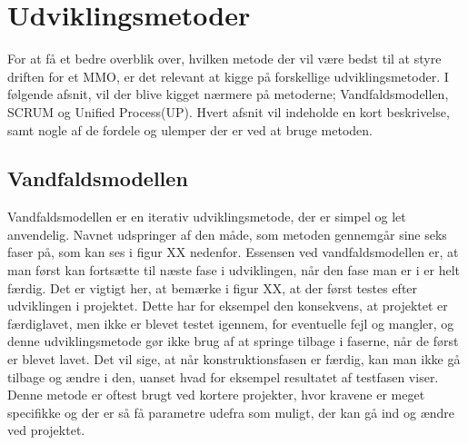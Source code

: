 \cfoot{\page\textbackslash \totalp} %
\chapter{Udviklingsmetoder}
For at få et bedre overblik over, hvilken metode der vil være bedst til at styre driften for et MMO, er det relevant at kigge på forskellige udviklingsmetoder. I følgende afsnit, vil der blive kigget nærmere på metoderne; Vandfaldsmodellen, SCRUM og Unified Process(UP). Hvert afsnit vil indeholde en kort beskrivelse, samt nogle af de fordele og ulemper der er ved at bruge metoden.

\section{Vandfaldsmodellen}\cite{HTL}
Vandfaldsmodellen er en iterativ udviklingsmetode, der er simpel og let anvendelig. Navnet udspringer af den måde, som metoden gennemgår sine seks faser på, som kan ses i figur XX nedenfor. Essensen ved vandfaldsmodellen er, at man først kan fortsætte til næste fase i udviklingen, når den fase man er i er helt færdig. Det er vigtigt her, at bemærke i figur XX, at der først testes efter udviklingen i projektet. Dette har for eksempel den konsekvens, at projektet er færdiglavet, men ikke er blevet testet igennem, for eventuelle fejl og mangler, og denne udviklingsmetode gør ikke brug af at springe tilbage i faserne, når de først er blevet lavet. Det vil sige, at når konstruktionsfasen er færdig, kan man ikke gå tilbage og ændre i den, uanset hvad for eksempel resultatet af testfasen viser. Denne metode er oftest brugt ved kortere projekter, hvor kravene er meget specifikke og der er så få parametre udefra som muligt, der kan gå ind og ændre ved projektet.

